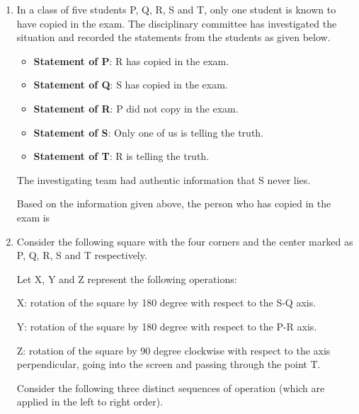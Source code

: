 \documentclass[12pt,a4paper]{article}
\begin{document}
\begin{enumerate}
   \item In a class of five students P, Q, R, S and T, only one student is known to have copied in the exam. The disciplinary committee has investigated the situation and recorded the statements from the students as given below.

         \begin{itemize}
            \item \textbf{Statement of P}: R has copied in the exam.
            \item \textbf{Statement of Q}: S has copied in the exam.
            \item \textbf{Statement of R}: P did not copy in the exam.
            \item \textbf{Statement of S}: Only one of us is telling the truth.
            \item \textbf{Statement of T}: R is telling the truth.
         \end{itemize}

         The investigating team had authentic information that S never lies.

         Based on the information given above, the person who has copied in the exam is
         \begin{enumerate}
         \end{enumerate}

   \item Consider the following square with the four corners and the center marked as P, Q, R, S and T respectively.

         Let X, Y and Z represent the following operations:

         X: rotation of the square by 180 degree with respect to the S-Q axis.

         Y: rotation of the square by 180 degree with respect to the P-R axis.

         Z: rotation of the square by 90 degree clockwise with respect to the axis perpendicular, going into the screen and passing through the point T.

         Consider the following three distinct sequences of operation (which are applied in the left to right order).


\end{enumerate}
\end{document}
